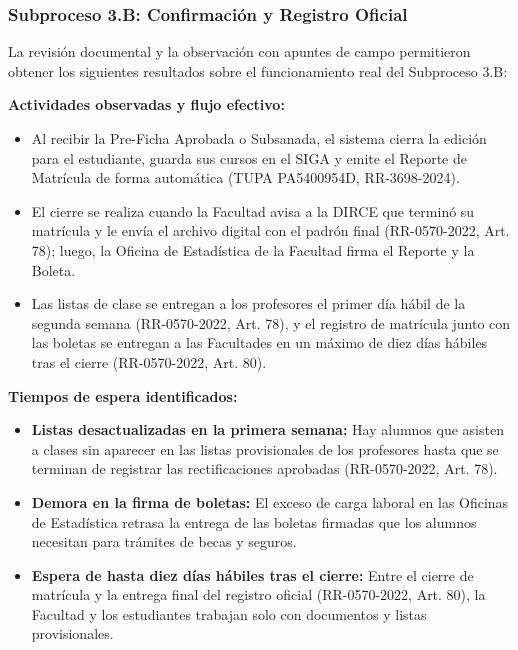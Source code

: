 \subsubsection{Subproceso 3.B: Confirmación y Registro Oficial}

La revisión documental y la observación con apuntes de campo permitieron obtener los siguientes resultados sobre el funcionamiento real del Subproceso 3.B:

\textbf{Actividades observadas y flujo efectivo:}
\begin{itemize}
    \item Al recibir la Pre-Ficha Aprobada o Subsanada, el sistema cierra la edición para el estudiante, guarda sus cursos en el SIGA y emite el Reporte de Matrícula de forma automática (TUPA PA5400954D, RR-3698-2024).
    \item El cierre se realiza cuando la Facultad avisa a la DIRCE que terminó su matrícula y le envía el archivo digital con el padrón final (RR-0570-2022, Art. 78\textdegree{}); luego, la Oficina de Estadística de la Facultad firma el Reporte y la Boleta.
    \item Las listas de clase se entregan a los profesores el primer día hábil de la segunda semana (RR-0570-2022, Art. 78\textdegree{}), y el registro de matrícula junto con las boletas se entregan a las Facultades en un máximo de diez días hábiles tras el cierre (RR-0570-2022, Art. 80\textdegree{}).
\end{itemize}

\textbf{Tiempos de espera identificados:}
\begin{itemize}
    \item \textbf{Listas desactualizadas en la primera semana:} Hay alumnos que asisten a clases sin aparecer en las listas provisionales de los profesores hasta que se terminan de registrar las rectificaciones aprobadas (RR-0570-2022, Art. 78\textdegree{}).
    \item \textbf{Demora en la firma de boletas:} El exceso de carga laboral en las Oficinas de Estadística retrasa la entrega de las boletas firmadas que los alumnos necesitan para trámites de becas y seguros.
    \item \textbf{Espera de hasta diez días hábiles tras el cierre:} Entre el cierre de matrícula y la entrega final del registro oficial (RR-0570-2022, Art. 80\textdegree{}), la Facultad y los estudiantes trabajan solo con documentos y listas provisionales.
\end{itemize}

